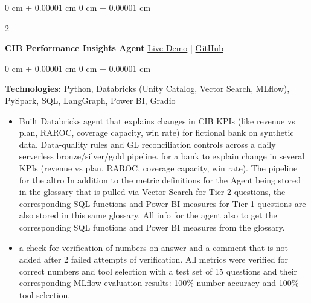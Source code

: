 \documentclass[10pt, letterpaper]{article}
\newenvironment{highlights}{
    \begin{itemize}[
        topsep=0.10 cm,
        parsep=0.10 cm,
        partopsep=0pt,
        itemsep=0pt,
        leftmargin=0 cm + 10pt
    ]
}{
    \end{itemize}
} %
\newenvironment{onecolentry}{
    \begin{adjustwidth}{
        0 cm + 0.00001 cm
    }{
        0 cm + 0.00001 cm
    }
}{
    \end{adjustwidth}
} %
\newenvironment{twocolentry}[2][]{
    \onecolentry
    \def\secondColumn{#2}
    \setcolumnwidth{\fill, 4.5 cm}
    \begin{paracol}{2}
}{
    \switchcolumn \raggedleft \secondColumn
    \end{paracol}
    \endonecolentry
} %
\begin{document}
        \begin{twocolentry}{
            \href{https://insights.inkandinfra.com}{Live Demo} |
            \href{https://github.com/hpk369/northlake-cib-insights-agent}{GitHub}
        }
            \textbf{CIB Performance Insights Agent}\end{twocolentry}
        \vspace{0.10 cm}
        \begin{onecolentry}
            \textbf{Technologies:}\> Python, Databricks (Unity Catalog, Vector Search, MLflow), PySpark, SQL, LangGraph, Power BI, Gradio
            \begin{highlights}
                \item Built Databricks agent that explains changes in CIB KPIs (like revenue vs plan, RAROC, coverage capacity, win rate) for fictional bank on synthetic data. Data-quality rules and GL reconciliation controls across a daily serverless bronze/silver/gold pipeline. for a bank to explain change in several KPIs (revenue vs plan, RAROC, coverage capacity, win rate). The pipeline for the altro In addition to the metric definitions for the Agent being stored in the glossary that is pulled via Vector Search for Tier 2 questions, the corresponding SQL functions and Power BI measures for Tier 1 questions are also stored in this same glossary. All info for the agent also to get the corresponding SQL functions and Power BI measures from the glossary.
                \item a check for verification of numbers on answer and a comment that is not added after 2 failed attempts of verification. All metrics were verified for correct numbers and tool selection with a test set of 15 questions and their corresponding MLflow evaluation results: 100\% number accuracy and 100\% tool selection.
            \end{highlights}
        \end{onecolentry}
\end{document}
